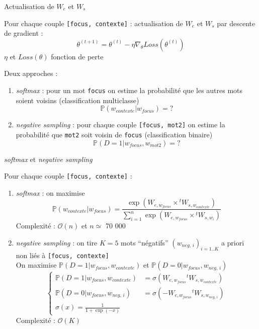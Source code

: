 \documentclass[10pt,xcolor=table,color={dvipsnames,usenames},ignorenonframetext,usepdftitle=false,french]{beamer}
\providecommand{\tightlist}{%
  \setlength{\parskip}{0pt}
  }
\begin{document}
\begin{frame}[fragile]{Actualisation de \(W_e\) et \(W_s\)}
\protect\hypertarget{actualisation-de-w_e-et-w_s}{}

Pour chaque couple \texttt{{[}focus,\ contexte{]}} : actualisation de
\(W_e\) et \(W_s\) par descente de gradient : \[
\theta^{(t+1)} = \theta^{(t)} - \eta \nabla_\theta Loss(\theta^{(t)})
\] \(\eta\)  et \(Loss(\theta)\)
fonction de perte

\pause

Deux approches :

\begin{enumerate}
\tightlist
\item
  \emph{softmax} : pour un mot \texttt{focus} on estime la probabilité
  que les autres mots soient voisins (classification multiclasse) \[
  \mathbb P(w_{contexte}\vert w_{focus}) = ?
  \] \pause
\item
  \emph{negative sampling} : pour chaque couple
  \texttt{{[}focus,\ mot2{]}} on estime la probabilité que \texttt{mot2}
  soit voisin de \texttt{focus} (classification binaire) \[
  \mathbb P(D=1\vert w_{focus},w_{mot2}) = ?
  \]
\end{enumerate}

\end{frame}

\begin{frame}[fragile]{\emph{softmax} et \emph{negative sampling}}
\protect\hypertarget{softmax-et-negative-sampling-1}{}

Pour chaque couple \texttt{{[}focus,\ contexte{]}} :

\begin{enumerate}
\item
  \emph{softmax} : on maximise \[
  \mathbb P(w_{contexte}\vert w_{focus}) = 
  \frac{
  \exp(W_{e,w_{focus}}\times {}^tW_{s,w_{contexte}})
  }{
  \sum_{i=1}^n\exp(W_{e,w_{focus}}\times {}^tW_{s,w_{i}})
  }
  \] \bcsmmh Complexité : \(\mathcal O (n)\) et \(n\simeq\) 70 000
  \pause
\item
  \emph{negative sampling} : on tire \(K=5\) mots ``négatifs''
  \((w_{neg,\,i})_{i=1..K}\) a priori non liés à
  \texttt{{[}focus,\ contexte{]}}\\
  On maximise \(\mathbb P(D=1\vert w_{focus},w_{contexte})\) et
  \(\mathbb P(D=0\vert w_{focus},w_{neg,\,i})\) \[
  \begin{cases}
  \mathbb P(D=1\vert w_{focus},w_{contexte})&=\sigma(W_{e,w_{focus}}{}^tW_{s,w_{contexte}})  \\
  \mathbb P(D=0\vert w_{focus},w_{neg,\,i})&=\sigma(-W_{e,w_{focus}}{}^tW_{s,w_{neg,\,i}}) 
  \\\sigma(x)=\frac{1}{1+\exp(-x)}
  \end{cases}
  \] \bcsmbh Complexité : \(\mathcal O (K)\)
\end{enumerate}

\end{frame}
\end{document}
